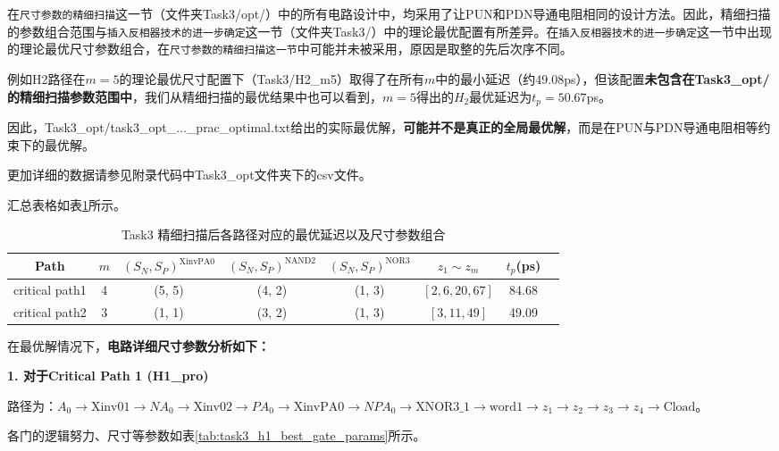 \documentclass[UTF8,12pt,a4paper]{ctexart}
\begin{document}
在\texttt{尺寸参数的精细扫描}这一节（文件夹Task3/opt/）中的所有电路设计中，均采用了让PUN和PDN导通电阻相同的设计方法。因此，精细扫描的参数组合范围与\texttt{插入反相器技术的进一步确定}这一节（文件夹Task3/）中的理论最优配置有所差异。在\texttt{插入反相器技术的进一步确定}这一节中出现的理论最优尺寸参数组合，在\texttt{尺寸参数的精细扫描这一节}中可能并未被采用，原因是取整的先后次序不同。

例如H2路径在$m=5$的理论最优尺寸配置下（Task3/H2\_m5）取得了在所有$m$中的最小延迟（约49.08ps），但该配置\textbf{未包含在Task3\_opt/的精细扫描参数范围中}，我们从精细扫描的最优结果中也可以看到，$m=5$得出的$H_2$最优延迟为$t_p = 50.67$ps。

因此，Task3\_opt/task3\_opt\_...\_prac\_optimal.txt给出的实际最优解，\textbf{可能并不是真正的全局最优解}，而是在PUN与PDN导通电阻相等约束下的最优解。


更加详细的数据请参见附录代码中Task3\_opt文件夹下的csv文件。

汇总表格如表\ref{tab:task3_final_best_tp}所示。

\begin{table}[htbp]
\centering
\caption{Task3 精细扫描后各路径对应的最优延迟以及尺寸参数组合}
\label{tab:task3_final_best_tp}
\small
\begin{tabular}{cccccccc}
\toprule
Path & $m$ & $(S_N, S_P)^{\text{XinvPA0}}$ & $(S_N, S_P)^{\text{NAND2}}$ & $(S_N, S_P)^{\text{NOR3}}$ & $z_1 \sim z_m$ & $t_p$(ps) \\
\midrule
critical path1 & 4 & (5, 5) & (4, 2) & (1, 3) & $[2, 6, 20, 67]$ & 84.68 \\
critical path2 & 3 & (1, 1) & (3, 2) & (1, 3) & $[3, 11, 49]$ & 49.09 \\
\bottomrule
\end{tabular}
\end{table}

在最优解情况下，\textbf{电路详细尺寸参数分析如下：}

\textbf{1. 对于Critical Path 1 (H1\_pro)}

路径为：$A_0 \rightarrow \text{Xinv01} \rightarrow NA_0 \rightarrow \text{Xinv02} \rightarrow PA_0 \rightarrow \text{XinvPA0} \rightarrow NPA_0 \rightarrow \text{XNOR3\_1} \rightarrow \text{word1} \rightarrow z_1 \rightarrow z_2 \rightarrow z_3 \rightarrow z_4 \rightarrow \text{Cload}$。

各门的逻辑努力、尺寸等参数如表\ref{tab:task3_h1_best_gate_params}所示。
\end{document}

